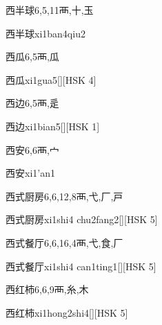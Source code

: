 \begin{Entry}{西半球}{6,5,11}{⾑,⼗,⽟}
  \begin{Phonetics}{西半球}{xi1ban4qiu2}
  \end{Phonetics}
\end{Entry}

\begin{Entry}{西瓜}{6,5}{⾑,⽠}
  \begin{Phonetics}{西瓜}{xi1gua5}[][HSK 4]
  \end{Phonetics}
\end{Entry}

\begin{Entry}{西边}{6,5}{⾑,⾡}
  \begin{Phonetics}{西边}{xi1bian5}[][HSK 1]
  \end{Phonetics}
\end{Entry}

\begin{Entry}{西安}{6,6}{⾑,⼧}
  \begin{Phonetics}{西安}{xi1'an1}
  \end{Phonetics}
\end{Entry}

\begin{Entry}{西式厨房}{6,6,12,8}{⾑,⼷,⼚,⼾}
  \begin{Phonetics}{西式厨房}{xi1shi4 chu2fang2}[][HSK 5]
  \end{Phonetics}
\end{Entry}

\begin{Entry}{西式餐厅}{6,6,16,4}{⾑,⼷,⾷,⼚}
  \begin{Phonetics}{西式餐厅}{xi1shi4 can1ting1}[][HSK 5]
  \end{Phonetics}
\end{Entry}

\begin{Entry}{西红柿}{6,6,9}{⾑,⽷,⽊}
  \begin{Phonetics}{西红柿}{xi1hong2shi4}[][HSK 5]
  \end{Phonetics}
\end{Entry}

